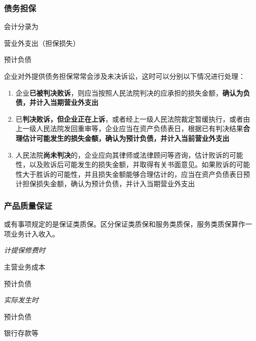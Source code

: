 \documentclass[UTF8,12pt]{ctexart}
\newenvironment{Dr}{%
	\begin{list}{}%
		{
			\setlength{\leftmargin}{2em}
			\setlength{\labelwidth}{2em}
			\setlength{\labelsep}{0pt}
			\setlength{\itemindent}{0pt}
			\setlength{\listparindent}{0pt}
			\setlength{\parsep}{0pt}
			\setlength{\topsep}{0pt}
		}
		\item[\textbf{借：}]
	}{%
	\end{list}
}
\newenvironment{Cr}{%
	\begin{list}{}%
		{
			\setlength{\leftmargin}{2em}
			\setlength{\labelwidth}{2em}
			\setlength{\labelsep}{0pt}
			\setlength{\itemindent}{0pt}
			\setlength{\listparindent}{0pt}
			\setlength{\parsep}{0pt}
			\setlength{\topsep}{0pt}
		}
		\item[\textbf{贷：}]
	}{%
	\end{list}
}
\numberwithin{equation}{section} %
\numberwithin{figure}{section}
\numberwithin{table}{section}
\begin{document}
	\subsubsection{债务担保}
	会计分录为
	
	\begin{Dr}
		营业外支出（担保损失）
	\end{Dr}
	\begin{Cr}
		预计负债
	\end{Cr}

	企业对外提供债务担保常常会涉及未决诉讼，这时可以分别以下情况进行处理：
	\begin{enumerate}
		\item 企业\textbf{已被判决败诉}，则应当按照人民法院判决的应承担的损失金额，\textbf{确认为负债，并计入当期营业外支出}
		
		\item 已\textbf{判决败诉，但企业正在上诉}，或者经上一级人民法院裁定暂缓执行，或者由上一级人民法院发回重审等，企业应当在资产负债表日，根据已有判决结果\textbf{合理估计可能发生的损失金额，确认为预计负债，并计入当前营业外支出}

		\item 人民法院\textbf{尚未判决}的，企业应向其律师或法律顾问等咨询，估计败诉的可能性，以及败诉后可能发生的损失金额，并取得有关书面意见。如果败诉的可能性大于胜诉的可能性，并且损失金额能够合理估计的，应当在资产负债表日预计担保损失金额，确认为预计负债，并计入当期营业外支出
	\end{enumerate}
	
	
	\subsubsection{产品质量保证}

	或有事项规定的是保证类质保。区分保证类质保和服务类质保，服务类质保算作一项业务计入收入。
	
	\textit{计提保修费时}
	
	\begin{Dr}
		主营业务成本
	\end{Dr}
	\begin{Cr}
		预计负债
	\end{Cr}
	
	\textit{实际发生时}
	
	\begin{Dr}
		预计负债
	\end{Dr}
	\begin{Cr}
		银行存款等
	\end{Cr}
	
\end{document}
